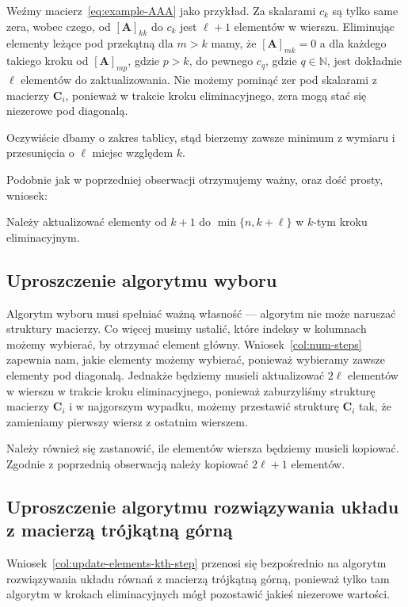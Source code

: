 \documentclass[../analysis.tex]{subfiles}
\newcommand{\AAA}{\mathbf{A}}
\newcommand{\CCC}{\mathbf{C}}
\begin{document}
  \begin{example}
    Weźmy macierz~\ref{eq:example-AAA} jako przykład. Za skalarami
    \( c_k \) są tylko same zera, wobec czego, od 
    \( [\AAA]_{kk} \) do \( c_k \) jest \( \ell + 1 \) elementów 
    w wierszu. Eliminując elementy leżące pod przekątną dla \( m > k \)
    mamy, że \( [\AAA]_{mk} = 0 \) a dla każdego takiego kroku
    od \( [\AAA]_{mp} \), gdzie \( p > k \), do pewnego \( c_q \),
    gdzie \( q \in \mathbb{N} \), jest dokładnie \( \ell \) elementów
    do zaktualizowania. Nie możemy pominąć zer pod skalarami z macierzy
    \( \CCC_i \), ponieważ w trakcie kroku eliminacyjnego, zera mogą stać się 
    niezerowe pod diagonalą. 

    Oczywiście dbamy o zakres tablicy, stąd bierzemy zawsze minimum
    z wymiaru i przesunięcia o \( \ell \) miejsc względem \( k \).
  \end{example}
  Podobnie jak w poprzedniej obserwacji otrzymujemy ważny, oraz dość prosty, wniosek:
  \begin{corollary} \label{col:update-elements-kth-step}
    Należy aktualizować elementy od \( k + 1 \) do \( \min \{ n, k + \ell \} \)
    w \( k \)-tym kroku eliminacyjnym.
  \end{corollary}

  \subsection{Uproszczenie algorytmu wyboru}

  Algorytm wyboru musi spełniać ważną własność --- algorytm nie może naruszać
  struktury macierzy. Co więcej musimy ustalić, które indeksy w kolumnach
  możemy wybierać, by otrzymać element główny. Wniosek~\ref{col:num-steps}
  zapewnia nam, jakie elementy możemy wybierać, ponieważ wybieramy
  zawsze elementy pod diagonalą. Jednakże będziemy musieli aktualizować
  \( 2 \ell \) elementów w wierszu w trakcie kroku eliminacyjnego, 
  ponieważ zaburzyliśmy strukturę macierzy \( \CCC_i \) i w najgorszym 
  wypadku, możemy przestawić strukturę \( \CCC_i \) tak, że zamieniamy
  pierwszy wiersz z ostatnim wierszem.
  
  Należy również się zastanowić, ile elementów wiersza będziemy musieli kopiować.
  Zgodnie z poprzednią obserwacją należy kopiować \( 2 \ell + 1 \) elementów.

  \subsection{Uproszczenie algorytmu rozwiązywania układu z macierzą trójkątną górną}
  Wniosek~\ref{col:update-elements-kth-step} przenosi się bezpośrednio
  na algorytm rozwiązywania układu równań z macierzą trójkątną górną,
  ponieważ tylko tam algorytm w krokach eliminacyjnych mógł
  pozostawić jakieś niezerowe wartości.
\end{document}
